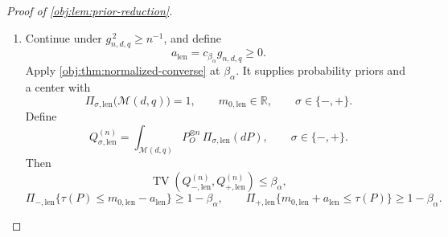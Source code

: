\begin{proof}[Proof of \cref{obj:lem:prior-reduction}]
\begin{enumerate}
\[\]
Each prior average is at most the worst-law risk, since its prior is
supported on \(\mathcal M(d,q)\). Hence
\[
2\sup_{P\in\mathcal M(d,q)}
  \mathbb E_P[(T(O^n)-\tau(P))^2]
\ge
\mathcal B_{-,\mathrm{pt}}(T)+\mathcal B_{+,\mathrm{pt}}(T)
\ge 2c_{\mathrm{sep,pt}}g_{n,d,q}^{\,2}.
\]
The estimator and target both lie in \([-1,1]\), so the squared loss lies
in \([0,4]\); these bounds justify the prior integrations and the finite
worst-law risks. The estimator class contains the constant zero estimator.
Taking its infimum as in \cref{obj:def:point-risk} proves
\[
\mathfrak R^*_{n,d,q}
\ge c_{\mathrm{sep,pt}}g_{n,d,q}^{\,2}
=\frac{13}{32}c_{\beta_0}^{\,2}g_{n,d,q}^{\,2}.
\]

\item Continue under \(g_{n,d,q}^{\,2}\ge n^{-1}\), and define
\[
a_{\mathrm{len}}=c_{\beta_\alpha}g_{n,d,q}\ge0.
\]
Apply \cref{obj:thm:normalized-converse} at \(\beta_\alpha\).
It supplies probability priors and a center with
\[
\Pi_{\sigma,\mathrm{len}}\bigl(\mathcal M(d,q)\bigr)=1,
\qquad
m_{0,\mathrm{len}}\in\mathbb R,
\qquad \sigma\in\{-,+\}.
\]
Define
\[
Q_{\sigma,\mathrm{len}}^{(n)}
=\int_{\mathcal M(d,q)}P_O^{\otimes n}\,
  \Pi_{\sigma,\mathrm{len}}(dP),
\qquad \sigma\in\{-,+\}.
\]
Then
\[
\operatorname{TV}\!\left(
Q_{-,\mathrm{len}}^{(n)},Q_{+,\mathrm{len}}^{(n)}
\right)\le\beta_\alpha,
\]
\[
\Pi_{-,\mathrm{len}}\{\tau(P)\le m_{0,\mathrm{len}}-a_{\mathrm{len}}\}
\ge1-\beta_\alpha,
\qquad
\Pi_{+,\mathrm{len}}\{m_{0,\mathrm{len}}+a_{\mathrm{len}}\le\tau(P)\}
\ge1-\beta_\alpha.
\]


\end{enumerate}
\end{proof}
